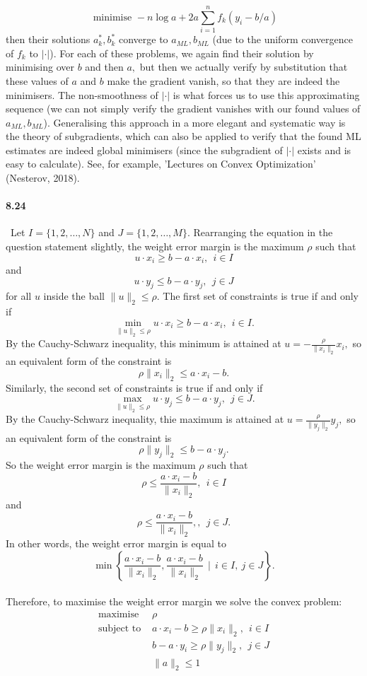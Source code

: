 \documentclass[a4paper,12pt]{article}
\begin{document}
$$ \text{ minimise } -n \log a + 2a \sum_{i=1}^n f_k(y_i - b/a)$$
then their solutions $a^*_k, b^*_k$ converge to $a_{ML}, b_{ML}$ (due to the uniform convergence of $f_k$ to $|\cdot|$). For each of these problems, we again find their solution by minimising over $b$ and then $a,$ but then we actually verify by substitution that these values of $a$ and $b$ make the gradient vanish, so that they are indeed the minimisers. The non-smoothness of $|\cdot|$ is what forces us to use this approximating sequence (we can not simply verify the gradient vanishes with our found values of $a_{ML}, b_{ML}$). Generalising this approach in a more elegant and systematic way is the theory of subgradients, which can also be applied to verify that the found ML estimates are indeed global minimisers (since the subgradient of $| \cdot|$ exists and is easy to calculate). See, for example, 'Lectures on Convex Optimization' (Nesterov, 2018).

\paragraph{8.24}
\
Let $I = \{ 1, 2, \ldots, N\}$ and $J = \{ 1, 2, \ldots, M\}.$ Rearranging the equation in the question statement slightly, the weight error margin is the maximum $\rho$ such that $$u\cdot x_i \geq b - a\cdot x_i, \ \ i\in I$$ and $$u\cdot y_j \leq b - a\cdot y_j, \ \ j\in J$$ for all $u$ inside the ball $\| u \|_2 \leq \rho.$ The first set of constraints is true if and only if $$\min_{\|u\|_2\leq \rho} u\cdot x_i \geq b-a\cdot x_i, \ \ i \in I.$$ By the Cauchy-Schwarz inequality, this minimum is attained at $\displaystyle u = -\frac{\rho}{\| x_i\|_2 } x_i,$ so an equivalent form of the constraint is $$\rho \| x_i \|_2 \leq a\cdot x_i -b.$$
\newline
Similarly, the second set of constraints is true if and only if 
$$\max_{\| u \|_2 \leq \rho} u \cdot y_j \leq b-a\cdot y_j, \ \ j\in J.$$
By the Cauchy-Schwarz inequality, thie maximum is attained at $\displaystyle u = \frac{\rho}{\| y_j\|_2} y_j,$ so an equivalent form of the constraint is $$\rho \| y_j\|_2 \leq b - a\cdot y_j.$$
So the weight error margin is the maximum $\rho$ such that $$ \rho \leq \frac{a\cdot x_i -b}{\| x_i\|_2}, \ \ i \in I$$ and $$\rho \leq \frac{a\cdot x_i -b}{\| x_i\|_2},, \ \ j\in J.$$ In other words, the weight error margin is equal to $$ \min \left\{ \frac{a\cdot x_i -b}{\| x_i\|_2},\frac{a\cdot x_i -b}{\| x_i\|_2} \ \ \bigg| \ \ i\in I, \ j\in J \right\}.$$\\
\newline
Therefore, to maximise the weight error margin we solve the convex problem:
\begin{align*}
 \text{maximise \ \ \ \  } &\rho \\
 \text{subject to \ \ \ } & a\cdot x_i - b \geq \rho \| x_i\|_2, \ \ i \in I \\
                          & b-a\cdot y_i \geq \rho \|y_j\|_2, \ \ j\in J\\
                          & \| a\|_2 \leq 1
\end{align*}
\end{document}
